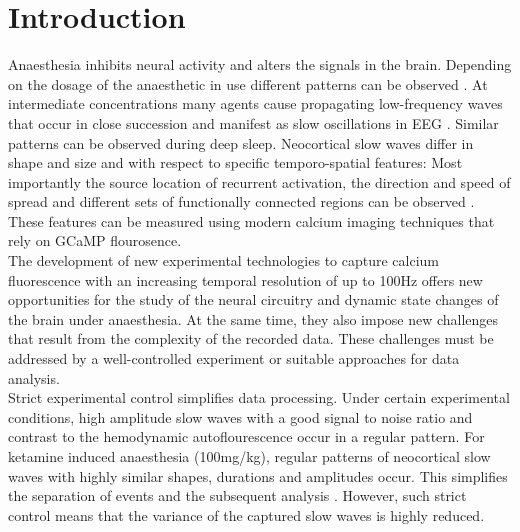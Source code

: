 
\chapter{Introduction} %

\label{Chapter1} %
\newcommand{\keyword}[1]{\textbf{#1}}
\newcommand{\tabhead}[1]{\textbf{#1}}
\newcommand{\code}[1]{\texttt{#1}}
\newcommand{\file}[1]{\texttt{\bfseries#1}}
\newcommand{\option}[1]{\texttt{\itshape#1}}
Anaesthesia inhibits neural activity and alters the signals in the brain. Depending on the dosage of the anaesthetic in use different patterns can be observed \parencite{eger1981isoflurane}. At intermediate concentrations many agents cause propagating low-frequency waves that occur in close succession and manifest as slow oscillations in EEG \parencite{steriade1993novel, eger1981isoflurane}. Similar patterns can be observed during deep sleep. Neocortical slow waves differ in shape and size and with respect to specific temporo-spatial features: Most importantly the source location of recurrent activation, the direction and speed of spread and different sets of functionally connected regions can be observed \parencite{brown2012control}. These features can be measured using modern calcium imaging techniques that rely on GCaMP flourosence.\\
The development of new experimental technologies to capture calcium fluorescence with an increasing temporal resolution of up to 100Hz offers new opportunities for the study of the neural circuitry and dynamic state changes of the brain under anaesthesia. At the same time, they also impose new challenges that result from the complexity of the recorded data. These challenges must be addressed by a well-controlled experiment or suitable approaches for data analysis.\\
Strict experimental control simplifies data processing. Under certain experimental conditions, high amplitude slow waves with a good signal to noise ratio and contrast to the hemodynamic autoflourescence occur in a regular pattern. For ketamine induced anaesthesia (100mg/kg), regular patterns of neocortical slow waves with highly similar shapes, durations and amplitudes occur. This simplifies the separation of events and the subsequent analysis \parencite{celotto2020analysis}. However, such strict control means that the variance of the captured slow waves is highly reduced.\\
